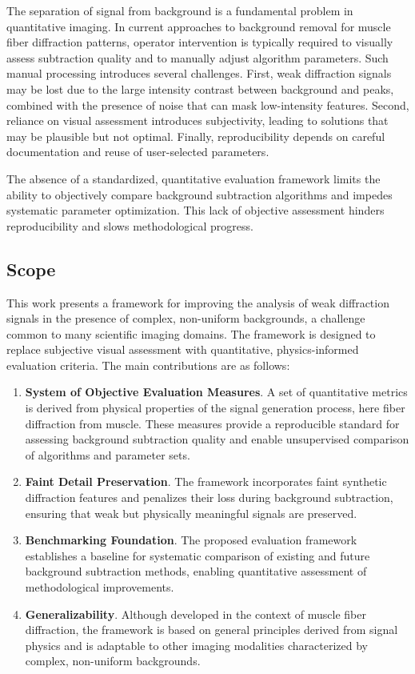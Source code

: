 \documentclass[iucr,review]{iucrjournals}
\begin{document}
The separation of signal from background is a fundamental problem in quantitative imaging. In current approaches to background removal for muscle fiber diffraction patterns, operator intervention is typically required to visually assess subtraction quality and to manually adjust algorithm parameters. Such manual processing introduces several challenges. First, weak diffraction signals may be lost due to the large intensity contrast between background and peaks, combined with the presence of noise that can mask low-intensity features. Second, reliance on visual assessment introduces subjectivity, leading to solutions that may be plausible but not optimal. Finally, reproducibility depends on careful documentation and reuse of user-selected parameters.

The absence of a standardized, quantitative evaluation framework limits the ability to objectively compare background subtraction algorithms and impedes systematic parameter optimization. This lack of objective assessment hinders reproducibility and slows methodological progress.

\subsection{Scope}

This work presents a framework for improving the analysis of weak diffraction signals in the presence of complex, non-uniform backgrounds, a challenge common to many scientific imaging domains. The framework is designed to replace subjective visual assessment with quantitative, physics-informed evaluation criteria. The main contributions are as follows:

\begin{enumerate}

\item \textbf{System of Objective Evaluation Measures}. A set of quantitative metrics is derived from physical properties of the signal generation process, here fiber diffraction from muscle. These measures provide a reproducible standard for assessing background subtraction quality and enable unsupervised comparison of algorithms and parameter sets.

\item \textbf{Faint Detail Preservation}. The framework incorporates faint synthetic diffraction features and penalizes their loss during background subtraction, ensuring that weak but physically meaningful signals are preserved.

\item \textbf{Benchmarking Foundation}. The proposed evaluation framework establishes a baseline for systematic comparison of existing and future background subtraction methods, enabling quantitative assessment of methodological improvements.

\item \textbf{Generalizability}. Although developed in the context of muscle fiber diffraction, the framework is based on general principles derived from signal physics and is adaptable to other imaging modalities characterized by complex, non-uniform backgrounds.

\end{enumerate}
\end{document}
